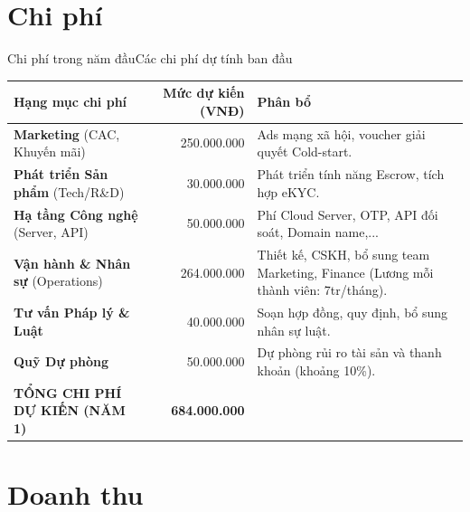 \section{Chi phí}

\begin{frame}{Chi phí trong năm đầu}{Các chi phí dự tính ban đầu}

\begin{table}[ht]
\centering
\small
\begin{tabular}{p{4.2cm} r p{6.2cm}}
\hline
\textbf{Hạng mục chi phí} &
\textbf{Mức dự kiến (VNĐ)} &
\textbf{Phân bổ} \\
\hline

\textbf{Marketing} (CAC, Khuyến mãi) &
250.000.000 &
Ads mạng xã hội, voucher giải quyết Cold-start. \\

\textbf{Phát triển Sản phẩm} (Tech/R\&D) &
30.000.000 &
Phát triển tính năng Escrow, tích hợp eKYC. \\

\textbf{Hạ tầng Công nghệ} (Server, API) &
50.000.000 &
Phí Cloud Server, OTP, API đối soát, Domain name,... \\

\textbf{Vận hành \& Nhân sự} (Operations) &
264.000.000 &
Thiết kế, CSKH, bổ sung team Marketing, Finance (Lương mỗi thành viên: 7tr/tháng). \\

\textbf{Tư vấn Pháp lý \& Luật} &
40.000.000 &
Soạn hợp đồng, quy định, bổ sung nhân sự luật. \\

\textbf{Quỹ Dự phòng} &
50.000.000 &
Dự phòng rủi ro tài sản và thanh khoản (khoảng 10\%). \\

\hline
\textbf{TỔNG CHI PHÍ DỰ KIẾN (NĂM 1)} &
\textbf{684.000.000} &
\\
\hline
\end{tabular}
\end{table}

\end{frame}

\section{Doanh thu}

